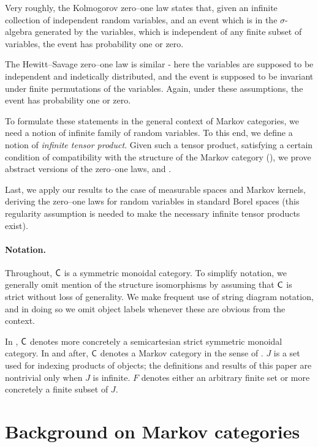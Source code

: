 \documentclass[11pt]{article}
\begin{document}
Very roughly, the Kolmogorov zero--one law states that, given an infinite collection of independent random variables, and an event which is in the $\sigma$-algebra generated by the variables, which is independent of any finite subset of variables, the event has probability one or zero.

The Hewitt--Savage zero--one law is similar - here the variables are supposed to be independent and indetically distributed, and the event is supposed to be invariant under finite permutations of the variables. Again, under these assumptions, the event has probability one or zero.

To formulate these statements in the general context of Markov categories, we need a notion of infinite family of random variables.
To this end, we define a notion of \emph{infinite tensor product}. Given such a tensor product, satisfying a certain condition of compatibility with the structure of the Markov category (), we prove abstract versions of the zero--one laws,  and .

Last, we apply our results to the case of measurable spaces and Markov kernels, deriving the zero--one laws for random variables in standard Borel spaces (this regularity assumption is needed to make the necessary infinite tensor products exist).

\paragraph*{Notation.} 

Throughout, $\mathsf{C}$ is a symmetric monoidal category. To simplify notation, we generally omit mention of the structure isomorphisms by assuming that $\mathsf{C}$ is strict without loss of generality. We make frequent use of string diagram notation, and in doing so we omit object labels whenever these are obvious from the context.

In , $\mathsf{C}$ denotes more concretely a semicartesian strict symmetric monoidal category. In  and after, $\mathsf{C}$ denotes a Markov category in the sense of . $J$ is a set used for indexing products of objects; the definitions and results of this paper are nontrivial only when $J$ is infinite. $F$ denotes either an arbitrary finite set or more concretely a finite subset of $J$.

\section{Background on Markov categories}\label{background}
\end{document}
